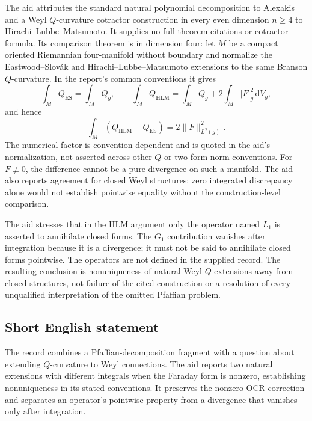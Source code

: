 \documentclass[11pt]{article}
\newcommand{\dd}{\,\mathrm{d}}
\begin{document}
The aid attributes the standard natural polynomial decomposition to Alexakis and a Weyl \(Q\)-curvature cotractor construction in every even dimension \(n\ge4\) to Hirachi--Lubbe--Matsumoto. It supplies no full theorem citations or cotractor formula. Its comparison theorem is in dimension four: let \(M\) be a compact oriented Riemannian four-manifold without boundary and normalize the Eastwood--Slovák and Hirachi--Lubbe--Matsumoto extensions to the same Branson \(Q\)-curvature. In the report's common conventions it gives
\[
 \int_M Q_{\mathrm{ES}}=\int_M Q_g,\qquad
 \int_M Q_{\mathrm{HLM}}=\int_M Q_g+2\int_M|F|_g^2\dd V_g,
\]
and hence
\[
 \int_M(Q_{\mathrm{HLM}}-Q_{\mathrm{ES}})
 =2\|F\|_{L^2(g)}^2.
\]
The numerical factor is convention dependent and is quoted in the aid's normalization, not asserted across other \(Q\) or two-form norm conventions. For \(F\not\equiv0\), the difference cannot be a pure divergence on such a manifold. The aid also reports agreement for closed Weyl structures; zero integrated discrepancy alone would not establish pointwise equality without the construction-level comparison.

The aid stresses that in the HLM argument only the operator named \(L_1\) is asserted to annihilate closed forms. The \(G_1\) contribution vanishes after integration because it is a divergence; it must not be said to annihilate closed forms pointwise. The operators are not defined in the supplied record. The resulting conclusion is nonuniqueness of natural Weyl \(Q\)-extensions away from closed structures, not failure of the cited construction or a resolution of every unqualified interpretation of the omitted Pfaffian problem.
\subsection{Short English statement}
The record combines a Pfaffian-decomposition fragment with a question about extending \(Q\)-curvature to Weyl connections. The aid reports two natural extensions with different integrals when the Faraday form is nonzero, establishing nonuniqueness in its stated conventions. It preserves the nonzero OCR correction and separates an operator's pointwise property from a divergence that vanishes only after integration.
\end{document}

